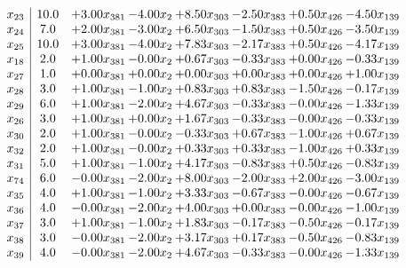 \documentclass[8pt]{article}
\begin{document}
\[\begin{array}{c| c c@{\hskip 2pt} c@{\hskip 2pt} c@{\hskip 2pt} c@{\hskip 2pt} c@{\hskip 2pt} c@{\hskip 2pt} }
 x_{23}   &  10.0 & +  3.00 x_{381} & -4.00 x_{2} & +  8.50 x_{303} & -2.50 x_{383} & +  0.50 x_{426} & -4.50 x_{139}\\
 x_{24}   &  7.0 & +  2.00 x_{381} & -3.00 x_{2} & +  6.50 x_{303} & -1.50 x_{383} & +  0.50 x_{426} & -3.50 x_{139}\\
 x_{25}   &  10.0 & +  3.00 x_{381} & -4.00 x_{2} & +  7.83 x_{303} & -2.17 x_{383} & +  0.50 x_{426} & -4.17 x_{139}\\
 x_{18}   &  2.0 & +  1.00 x_{381} & -0.00 x_{2} & +  0.67 x_{303} & -0.33 x_{383} & +  0.00 x_{426} & -0.33 x_{139}\\
 x_{27}   &  1.0 & +  0.00 x_{381} & +  0.00 x_{2} & +  0.00 x_{303} & +  0.00 x_{383} & +  0.00 x_{426} & +  1.00 x_{139}\\
 x_{28}   &  3.0 & +  1.00 x_{381} & -1.00 x_{2} & +  0.83 x_{303} & +  0.83 x_{383} & -1.50 x_{426} & -0.17 x_{139}\\
 x_{29}   &  6.0 & +  1.00 x_{381} & -2.00 x_{2} & +  4.67 x_{303} & -0.33 x_{383} & -0.00 x_{426} & -1.33 x_{139}\\
 x_{26}   &  3.0 & +  1.00 x_{381} & +  0.00 x_{2} & +  1.67 x_{303} & -0.33 x_{383} & -0.00 x_{426} & -0.33 x_{139}\\
 x_{30}   &  2.0 & +  1.00 x_{381} & -0.00 x_{2} & -0.33 x_{303} & +  0.67 x_{383} & -1.00 x_{426} & +  0.67 x_{139}\\
 x_{32}   &  2.0 & +  1.00 x_{381} & -0.00 x_{2} & +  0.33 x_{303} & +  0.33 x_{383} & -1.00 x_{426} & +  0.33 x_{139}\\
 x_{31}   &  5.0 & +  1.00 x_{381} & -1.00 x_{2} & +  4.17 x_{303} & -0.83 x_{383} & +  0.50 x_{426} & -0.83 x_{139}\\
 x_{74}   &  6.0 & -0.00 x_{381} & -2.00 x_{2} & +  8.00 x_{303} & -2.00 x_{383} & +  2.00 x_{426} & -3.00 x_{139}\\
 x_{35}   &  4.0 & +  1.00 x_{381} & -1.00 x_{2} & +  3.33 x_{303} & -0.67 x_{383} & -0.00 x_{426} & -0.67 x_{139}\\
 x_{36}   &  4.0 & -0.00 x_{381} & -2.00 x_{2} & +  4.00 x_{303} & +  0.00 x_{383} & -0.00 x_{426} & -1.00 x_{139}\\
 x_{37}   &  3.0 & +  1.00 x_{381} & -1.00 x_{2} & +  1.83 x_{303} & -0.17 x_{383} & -0.50 x_{426} & -0.17 x_{139}\\
 x_{38}   &  3.0 & -0.00 x_{381} & -2.00 x_{2} & +  3.17 x_{303} & +  0.17 x_{383} & -0.50 x_{426} & -0.83 x_{139}\\
 x_{39}   &  4.0 & -0.00 x_{381} & -2.00 x_{2} & +  4.67 x_{303} & -0.33 x_{383} & -0.00 x_{426} & -1.33 x_{139}\\

\end{array}\]
\end{document}
